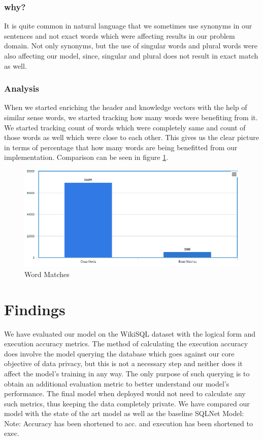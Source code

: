 \documentclass[12pt]{article}
\begin{document}
\subsubsection{why?}
It is quite common in natural language that we sometimes use synonyms in our sentences and not exact words which were affecting results in our problem domain. Not only synonyms, but the use of singular words and plural words were also affecting our model, since, singular and plural does not result in exact match as well. 

\subsubsection{Analysis}
When we started enriching the header and knowledge vectors with the help of similar sense words, we started tracking how many words were benefiting from it. We started tracking count of words which were completely same and count of those words as well which were close to each other. This gives us the clear picture in terms of percentage that how many words are being benefitted from our implementation. Comparison can be seen in figure \ref{WordMatches}.

\begin{figure}[H]
    \includegraphics[width=450pt]{wordmatches}
	\caption{Word Matches}
    \label{WordMatches}
\end{figure}

\section{Findings}


We have evaluated our model on the WikiSQL dataset with
the logical form and execution accuracy metrics. The method
of calculating the execution accuracy does involve the model
querying the database which goes against our core objective of
data privacy, but this is not a necessary step and neither does
it affect the model’s training in any way. The only purpose of
such querying is to obtain an additional evaluation metric to
better understand our model’s performance. The final model
when deployed would not need to calculate any such metrics,
thus keeping the data completely private.
We have compared our model with the state of the art model
as well as the baseline SQLNet Model:
Note: Accuracy has been shortened to acc. and execution
has been shortened to exec.
\end{document}
